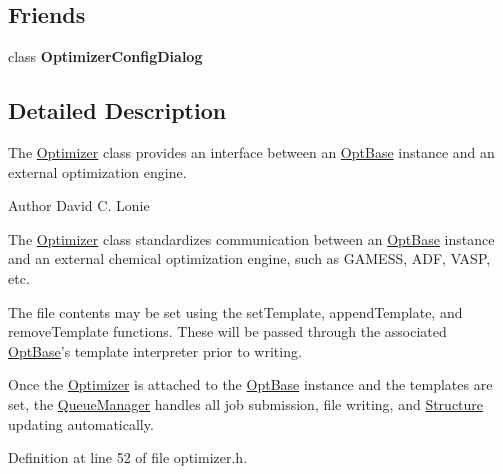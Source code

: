 \subsection*{Friends}
\begin{DoxyCompactItemize}
\item 
\hypertarget{classGlobalSearch_1_1Optimizer_a820134b906cccccfc214c45661db99bf}{class {\bfseries Optimizer\-Config\-Dialog}}\label{classGlobalSearch_1_1Optimizer_a820134b906cccccfc214c45661db99bf}

\end{DoxyCompactItemize}


\subsection{Detailed Description}
The \hyperlink{classGlobalSearch_1_1Optimizer}{Optimizer} class provides an interface between an \hyperlink{classGlobalSearch_1_1OptBase}{Opt\-Base} instance and an external optimization engine. 

\begin{DoxyAuthor}{Author}
David C. Lonie
\end{DoxyAuthor}
The \hyperlink{classGlobalSearch_1_1Optimizer}{Optimizer} class standardizes communication between an \hyperlink{classGlobalSearch_1_1OptBase}{Opt\-Base} instance and an external chemical optimization engine, such as G\-A\-M\-E\-S\-S, A\-D\-F, V\-A\-S\-P, etc.

The file contents may be set using the set\-Template, append\-Template, and remove\-Template functions. These will be passed through the associated \hyperlink{classGlobalSearch_1_1OptBase}{Opt\-Base}'s template interpreter prior to writing.

Once the \hyperlink{classGlobalSearch_1_1Optimizer}{Optimizer} is attached to the \hyperlink{classGlobalSearch_1_1OptBase}{Opt\-Base} instance and the templates are set, the \hyperlink{classGlobalSearch_1_1QueueManager}{Queue\-Manager} handles all job submission, file writing, and \hyperlink{classGlobalSearch_1_1Structure}{Structure} updating automatically. 

Definition at line 52 of file optimizer.\-h.



